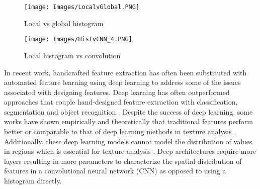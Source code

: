 \documentclass[journal]{IEEEtai}
\begin{document}
\begin{figure*}[t]
	\begin{subfigure}{.50\textwidth}{
			\texttt{[image: Images/LocalvGlobal.PNG]}
			\caption{Local vs global histogram}
			\label{fig:Toy_Hist}
		}
	\end{subfigure} 
	\hspace{1mm}
	\begin{subfigure}{.42\textwidth}{
			\texttt{[image: Images/HistvCNN\_4.PNG]}
			\caption{Local histogram vs convolution}
			\label{fig:Toy_conv}
		}
	\end{subfigure}
	\caption{Toy 4$\times$4 images showing the disadvantages of a global histogram (\ref{fig:Toy_Hist}) and convolution operation (\ref{fig:Toy_conv}). The local histograms and convolutions use a kernel size of $3 \times 3$ to produce $2 \times 2$ feature maps. On the left in \ref{fig:Toy_Hist}, the two images are distinct textures. If a global histogram is computed, the distribution of white and black pixels is equivalent resulting in no discrimination between the two texture types. On the right in \ref{fig:Toy_conv}, convolution operations are sensitive to image transformations such as rotations. The two textures shown are the same, but applying filters from a convolutional neural network such as ResNet18 in local areas results in different feature maps (FM). However, a local histogram provides some rotational invariance and learns the same local distribution of pixels for each image.}
	\label{fig:Toy_example}
\end{figure*} 

In recent work, handcrafted feature extraction has often been substituted with automated feature learning using deep learning to address some of the issues associated with designing features. Deep learning has often outperformed approaches that couple hand-designed feature extraction with classification, segmentation and object recognition  \cite{he2016deep,krizhevsky2012imagenet,liang2015recurrent,long2015fully}. Despite the success of deep learning, some works have shown empirically and theoretically that traditional features perform better or comparable to that of deep learning methods in texture analysis \cite{basu2016theoretical,basu2018deep,cavalin2017review,liu2017local}. Additionally, these deep learning models cannot model the distribution of values in regions which is essential for texture analysis \cite{tuceryan1993texture}. Deep architectures require more layers resulting in more parameters to characterize the spatial distribution of features in a convolutional neural network (CNN) as opposed to using a histogram directly.    
\end{document}
